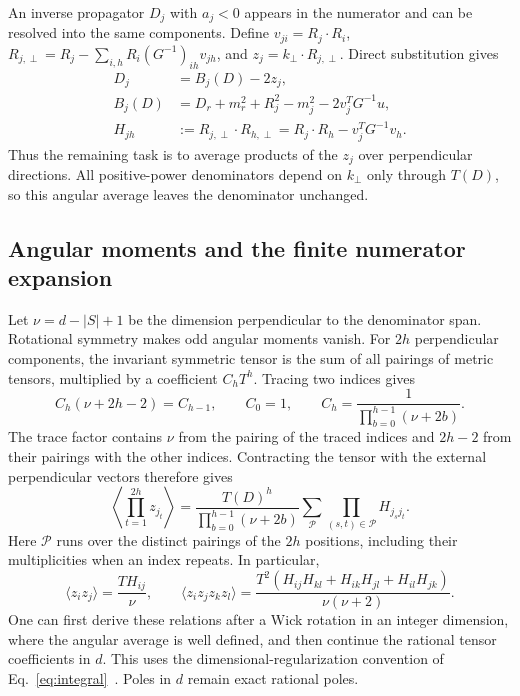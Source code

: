 An inverse propagator $D_j$ with $a_j<0$ appears in the numerator and can be resolved into the same components. Define $v_{ji}=R_j\cdot R_i$, $R_{j,\perp}=R_j-\sum_{i,h}R_i(G^{-1})_{ih}v_{jh}$, and $z_j=k_\perp\cdot R_{j,\perp}$. Direct substitution gives
\begin{align}
 D_j&=B_j(D)-2z_j,\\
 B_j(D)&=D_r+m_r^2+R_j^2-m_j^2-2v_j^TG^{-1}u,\\
 H_{jh}&:=R_{j,\perp}\cdot R_{h,\perp}
       =R_j\cdot R_h-v_j^TG^{-1}v_h.
 \label{eq:tensor-numerator}
\end{align}
Thus the remaining task is to average products of the $z_j$ over perpendicular directions. All positive-power denominators depend on $k_\perp$ only through $T(D)$, so this angular average leaves the denominator unchanged.

\subsection{Angular moments and the finite numerator expansion}
Let $\nu=d-|S|+1$ be the dimension perpendicular to the denominator span. Rotational symmetry makes odd angular moments vanish. For $2h$ perpendicular components, the invariant symmetric tensor is the sum of all pairings of metric tensors, multiplied by a coefficient $C_h T^h$. Tracing two indices gives
\begin{equation}
 C_h(\nu+2h-2)=C_{h-1},\qquad C_0=1,
 \qquad C_h=\frac{1}{\prod_{b=0}^{h-1}(\nu+2b)}.
 \label{eq:tensor-trace}
\end{equation}
The trace factor contains $\nu$ from the pairing of the traced indices and $2h-2$ from their pairings with the other indices. Contracting the tensor with the external perpendicular vectors therefore gives
\begin{equation}
 \left\langle\prod_{t=1}^{2h}z_{j_t}\right\rangle
 =\frac{T(D)^h}{\prod_{b=0}^{h-1}(\nu+2b)}
 \sum_{\mathcal P}\prod_{(s,t)\in\mathcal P}H_{j_sj_t}.
 \label{eq:tensor-moment}
\end{equation}
Here $\mathcal P$ runs over the distinct pairings of the $2h$ positions, including their multiplicities when an index repeats. In particular,
\begin{equation}
 \langle z_i z_j\rangle=\frac{T H_{ij}}{\nu},\qquad
 \langle z_i z_j z_k z_l\rangle
 =\frac{T^2(H_{ij}H_{kl}+H_{ik}H_{jl}+H_{il}H_{jk})}{\nu(\nu+2)}.
 \label{eq:tensor-low-moments}
\end{equation}
One can first derive these relations after a Wick rotation in an integer dimension, where the angular average is well defined, and then continue the rational tensor coefficients in $d$. This uses the dimensional-regularization convention of Eq.~\eqref{eq:integral}~\cite{Weinzierl2022}. Poles in $d$ remain exact rational poles.


